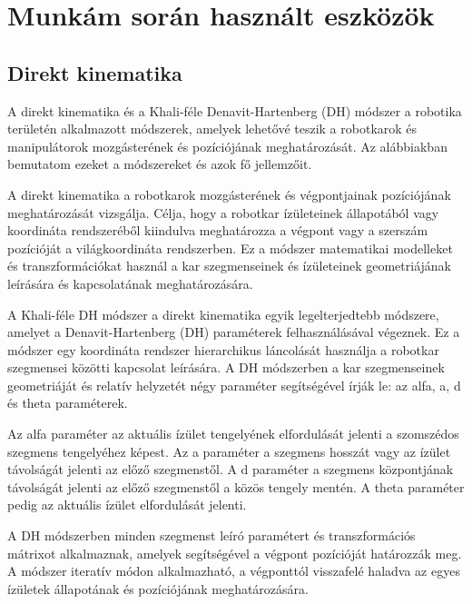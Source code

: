 \chapter{Munkám során használt eszközök}
\label{sec:LatexTools}
\section{Direkt kinematika}
A direkt kinematika és a Khali-féle Denavit-Hartenberg (DH) módszer a robotika területén alkalmazott módszerek, amelyek lehetővé teszik a robotkarok és manipulátorok mozgásterének és pozíciójának meghatározását. Az alábbiakban bemutatom ezeket a módszereket és azok fő jellemzőit.

A direkt kinematika a robotkarok mozgásterének és végpontjainak pozíciójának meghatározását vizsgálja. Célja, hogy a robotkar ízületeinek állapotából vagy koordináta rendszeréből kiindulva meghatározza a végpont vagy a szerszám pozícióját a világkoordináta rendszerben. Ez a módszer matematikai modelleket és transzformációkat használ a kar szegmenseinek és ízületeinek geometriájának leírására és kapcsolatának meghatározására.

A Khali-féle DH módszer a direkt kinematika egyik legelterjedtebb módszere, amelyet a Denavit-Hartenberg (DH) paraméterek felhasználásával végeznek. Ez a módszer egy koordináta rendszer hierarchikus láncolását használja a robotkar szegmensei közötti kapcsolat leírására. A DH módszerben a kar szegmenseinek geometriáját és relatív helyzetét négy paraméter segítségével írják le: az alfa, a, d és theta paraméterek.

Az alfa paraméter az aktuális ízület tengelyének elfordulását jelenti a szomszédos szegmens tengelyéhez képest. Az a paraméter a szegmens hosszát vagy az ízület távolságát jelenti az előző szegmenstől. A d paraméter a szegmens központjának távolságát jelenti az előző szegmenstől a közös tengely mentén. A theta paraméter pedig az aktuális ízület elfordulását jelenti.

A DH módszerben minden szegmenst leíró paramétert és transzformációs mátrixot alkalmaznak, amelyek segítségével a végpont pozícióját határozzák meg. A módszer iteratív módon alkalmazható, a végponttól visszafelé haladva az egyes ízületek állapotának és pozíciójának meghatározására.

